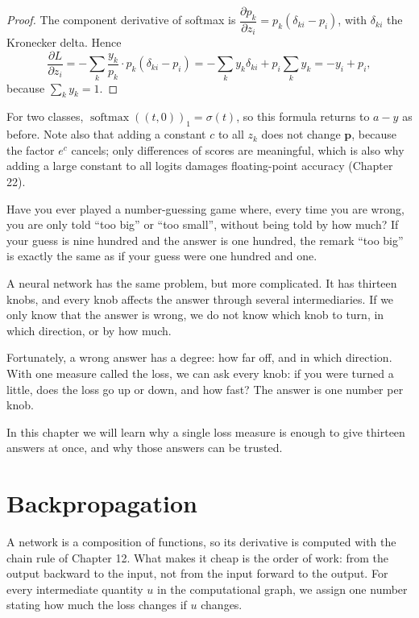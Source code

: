 \begin{proof}
The component derivative of softmax is
$\dfrac{\partial p_{k}}{\partial z_{i}}=p_{k}(\delta_{ki}-p_{i})$, with $\delta_{ki}$ the
Kronecker delta. Hence
\[
  \frac{\partial L}{\partial z_{i}}
  =-\sum_{k}\frac{y_{k}}{p_{k}}\cdot p_{k}(\delta_{ki}-p_{i})
  =-\sum_{k}y_{k}\delta_{ki}+p_{i}\sum_{k}y_{k}
  =-y_{i}+p_{i},
\]
because $\sum_{k}y_{k}=1$.
\end{proof}

For two classes, $\operatorname{softmax}((t,0))_{1}=\sigma(t)$, so this formula returns to $a-y$
as before. Note also that adding a constant $c$ to all $z_{k}$ does not change $\mathbf{p}$,
because the factor $e^{c}$ cancels; only differences of scores are meaningful, which is also why
adding a large constant to all logits damages floating-point accuracy (Chapter 22).

\begin{untukanak}
Have you ever played a number-guessing game where, every time you are wrong, you are only told
``too big'' or ``too small'', without being told by how much? If your guess is nine hundred and
the answer is one hundred, the remark ``too big'' is exactly the same as if your guess were one
hundred and one.

A neural network has the same problem, but more complicated. It has thirteen knobs, and every
knob affects the answer through several intermediaries. If we only know that the answer is
wrong, we do not know which knob to turn, in which direction, or by how much.

Fortunately, a wrong answer has a degree: how far off, and in which direction. With one measure
called the loss, we can ask every knob: if you were turned a little, does the loss go up or down,
and how fast? The answer is one number per knob.

In this chapter we will learn why a single loss measure is enough to give thirteen answers at
once, and why those answers can be trusted.
\end{untukanak}

\section{Backpropagation}

A network is a composition of functions, so its derivative is computed with the chain rule of
Chapter 12. What makes it cheap is the order of work: from the output backward to the input, not
from the input forward to the output. For every intermediate quantity $u$ in the computational
graph, we assign one number stating how much the loss changes if $u$ changes.

